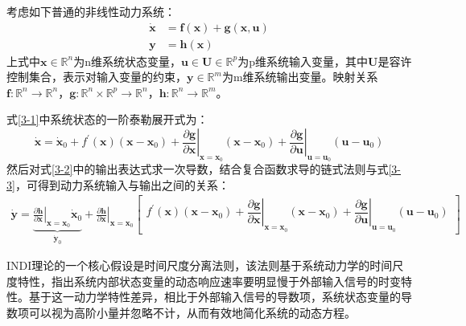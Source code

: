 考虑如下普通的非线性动力系统：
\begin{align}
    \dot{\boldsymbol{x}}&=\boldsymbol{f}(\boldsymbol{x})+\boldsymbol{g}(\boldsymbol{x},\boldsymbol{u}) \label{3-1}
    \\
    \boldsymbol{y}&=\boldsymbol{h}(\boldsymbol{x})\label{3-2}
\end{align}
上式中$\boldsymbol{x}\in\mathbb{R}^{n}$为n维系统状态变量，$\boldsymbol{u}\in\boldsymbol{U}\in\mathbb{R}^{p}$为p维系统输入变量，其中$\boldsymbol{U}$是容许控制集合，表示对输入变量的约束，$\boldsymbol{y}\in\mathbb{R}^{m}$为m维系统输出变量。映射关系$\boldsymbol{f}:\mathbb{R}^n\rightarrow\mathbb{R}^n$，$\boldsymbol{g}:\mathbb{R}^n\times\mathbb{R}^p\rightarrow\mathbb{R}^n$，$\boldsymbol{h}:\mathbb{R}^n\rightarrow\mathbb{R}^m$。

式\eqref{3-1}中系统状态的一阶泰勒展开式为：
\begin{equation}
    \dot{\boldsymbol{x}}=\dot{\boldsymbol{x}}_0+f^{\prime}(\boldsymbol{x})(\boldsymbol{x}-\boldsymbol{x}_0)+\left.\frac{\partial \boldsymbol{g}}{\partial \boldsymbol{x}}\right|_{\boldsymbol{x}=\boldsymbol{x}_0}(\boldsymbol{x}-\boldsymbol{x}_0)+\left.\frac{\partial \boldsymbol{g}}{\partial \boldsymbol{u}}\right|_{\boldsymbol{u}=\boldsymbol{u}_0}(\boldsymbol{u}-\boldsymbol{u}_0)
    \label{3-3}
\end{equation}
然后对式\eqref{3-2}中的输出表达式求一次导数，结合复合函数求导的链式法则与式\eqref{3-3}，可得到动力系统输入与输出之间的关系：
\begin{equation}
    \begin{aligned}
    \dot{\boldsymbol{y}} = \underbrace{\left.\frac{\partial\boldsymbol{h}}{\partial\boldsymbol{x}}\right|_{\boldsymbol{x}=\boldsymbol{x}_0}\dot{\boldsymbol{x}}_0}_{\dot{\boldsymbol{y}}_0} + \left.\frac{\partial \boldsymbol{h}}{\partial \boldsymbol{x}}\right|_{\boldsymbol{x}=\boldsymbol{x}_0}\begin{bmatrix}f^{\prime}(\boldsymbol{x})(\boldsymbol{x}-\boldsymbol{x}_0)+\left.\dfrac{\partial \boldsymbol{g}}{\partial \boldsymbol{x}}\right|_{\boldsymbol{x}=\boldsymbol{x}_0}(\boldsymbol{x}-\boldsymbol{x}_0)+\left.\dfrac{\partial \boldsymbol{g}}{\partial \boldsymbol{u}}\right|_{\boldsymbol{u}=\boldsymbol{u}_0}(\boldsymbol{u}-\boldsymbol{u}_0)\end{bmatrix}
    \end{aligned}
    \label{3-4}
\end{equation}

INDI理论的一个核心假设是时间尺度分离法则\cite{EnergyOptimal}，该法则基于系统动力学的时间尺度特性，指出系统内部状态变量的动态响应速率要明显慢于外部输入信号的时变特性。基于这一动力学特性差异，相比于外部输入信号的导数项，系统状态变量的导数项可以视为高阶小量并忽略不计，从而有效地简化系统的动态方程。

